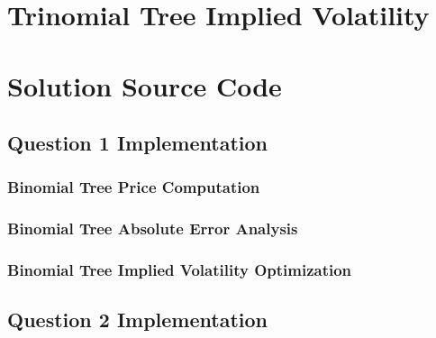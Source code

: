 \documentclass[10pt]{article}
\begin{document}
\newpage
\section{Trinomial Tree Implied Volatility} \label{appendix:q2:imp_vol}


\newpage
\section{Solution Source Code} \label{appendix:source}

    \subsection{Question 1 Implementation} \label{appendix:source:q1}

        \subsubsection{Binomial Tree Price Computation} \label{appendix:source:q1:prices}

            
        
        \subsubsection{Binomial Tree Absolute Error Analysis} \label{appendix:source:q1:abs_error}

            
        
        \subsubsection{Binomial Tree Implied Volatility Optimization} \label{appendix:source:q1:imp_vol}

            

    \newpage
    \subsection{Question 2 Implementation} \label{appendix:source:q2}
\end{document}

